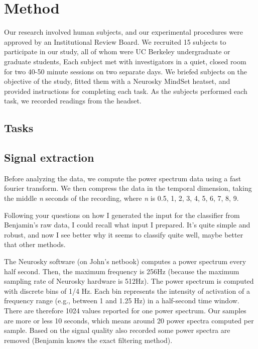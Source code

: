 \section{Method}

Our research involved human subjects, and our experimental procedures were approved by an Institutional Review Board. We recruited 15 subjects to participate in our study, all of whom were UC Berkeley undergraduate or graduate students, Each subject met with investigators in a quiet, closed room for two 40-50 minute sessions on two separate days. We briefed subjects on the objective of the study, fitted them with a Neurosky MindSet heatset, and provided instructions for completing each task. As the subjects performed each task, we recorded readings from the headset.

\subsection{Tasks}


\subsection{Signal extraction}

Before analyzing the data, we compute the power spectrum data using a fast fourier transform. We then compress the data in the temporal dimension, taking the middle \textit{n} seconds of the recording, where \textit{n} is {0.5, 1, 2, 3, 4, 5, 6, 7, 8, 9}. 



Following your questions on how I generated the input for the classifier from Benjamin's raw data, I could recall what input I prepared. It's quite simple and robust, and now I see better why it seems to classify quite well, maybe better that other methods.

The Neurosky software (on John's netbook) computes a power spectrum every half second. Then, the maximum frequency is 256Hz (because the maximum sampling rate of Neurosky hardware is 512Hz). The power spectrum is computed with discrete bins of 1/4 Hz. Each bin represents the intensity of activation of a frequency range (e.g., between 1 and 1.25 Hz) in a half-second time window. There are therefore 1024 values reported for one power spectrum. Our samples are more or less 10 seconds, which means around 20 power spectra computed per sample. Based on the signal quality also recorded some power spectra are removed (Benjamin knows the exact filtering method).

